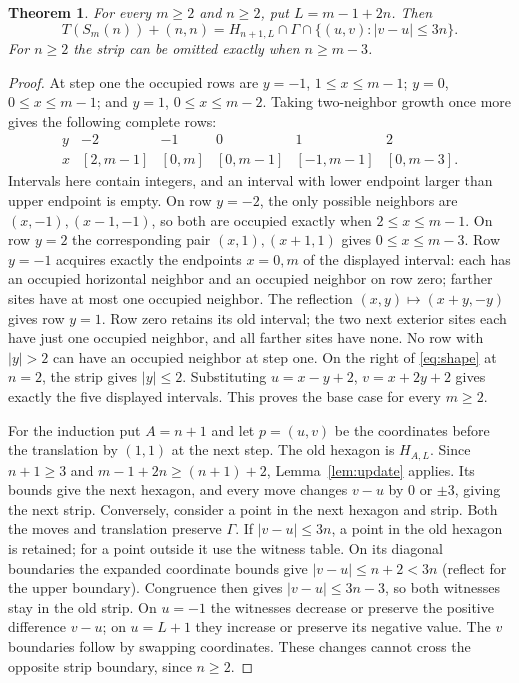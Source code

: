 \documentclass[11pt]{article}
\newtheorem{theorem}{Theorem}
\newcommand{\card}[1]{\lvert #1\rvert}
\begin{document}
\begin{theorem}\label{thm:shape}
For every $m\geq2$ and $n\geq2$, put $L=m-1+2n$. Then
\begin{equation}\label{eq:shape}
 T(S_m(n))+(n,n)=
 H_{n+1,L}\cap\Gamma\cap\{(u,v):|v-u|\leq3n\}.
\end{equation}
For $n\geq2$ the strip can be omitted exactly when $n\geq m-3$.
\end{theorem}
\begin{proof}
At step one the occupied rows are
$y=-1$, $1\leq x\leq m-1$;
$y=0$, $0\leq x\leq m-1$; and
$y=1$, $0\leq x\leq m-2$.
Taking two-neighbor growth once more gives the following complete rows:
\[
\begin{array}{c|ccccc}
y&-2&-1&0&1&2\\\hline
x&[2,m-1]&[0,m]&[0,m-1]&[-1,m-1]&[0,m-3].
\end{array}
\]
Intervals here contain integers, and an interval with lower endpoint larger
than upper endpoint is empty. On row $y=-2$, the only possible neighbors
are $(x,-1),(x-1,-1)$, so both are occupied exactly when
$2\leq x\leq m-1$. On row $y=2$ the corresponding pair
$(x,1),(x+1,1)$ gives $0\leq x\leq m-3$.
Row $y=-1$ acquires exactly the endpoints $x=0,m$ of the displayed interval:
each has an occupied horizontal neighbor and an occupied neighbor on row zero;
farther sites have at most one occupied neighbor. The reflection
$(x,y)\mapsto(x+y,-y)$ gives row $y=1$. Row zero retains its old interval;
the two next exterior sites each have just one occupied neighbor, and all
farther sites have none.
No row with $\card y>2$ can have an occupied neighbor at step one.
On the right of \eqref{eq:shape} at $n=2$, the strip gives $\card y\leq2$.
Substituting $u=x-y+2$, $v=x+2y+2$ gives exactly the five displayed
intervals. This proves the base case for every $m\geq2$.

For the induction put $A=n+1$ and let $p=(u,v)$ be the coordinates before
the translation by $(1,1)$ at the next step. The old hexagon is $H_{A,L}$.
Since $n+1\geq3$ and $m-1+2n\geq(n+1)+2$, Lemma~\ref{lem:update}
applies. Its bounds give the next hexagon, and every move changes $v-u$
by $0$ or $\pm3$, giving the next strip. Conversely, consider a point in
the next hexagon and strip. Both the moves and translation preserve $\Gamma$.
If $|v-u|\leq3n$, a point in the old hexagon is retained; for a point outside
it use the witness table.
On its diagonal boundaries the expanded coordinate bounds give
$|v-u|\leq n+2<3n$ (reflect for the upper boundary). Congruence then gives
$|v-u|\leq3n-3$, so both witnesses stay in the old strip. On $u=-1$ the
witnesses decrease or preserve the positive difference $v-u$; on $u=L+1$
they increase or preserve its negative value. The $v$ boundaries follow
by swapping coordinates. These changes cannot cross the opposite strip
boundary, since $n\geq2$.


\end{proof}
\end{document}
